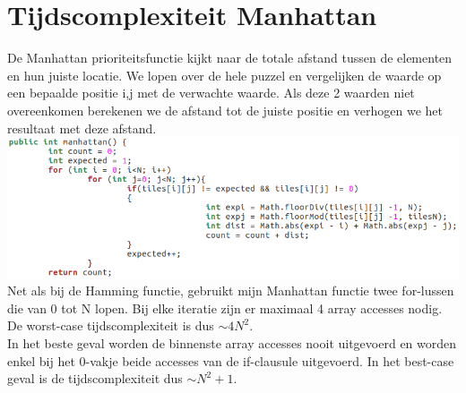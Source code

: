 \documentclass[11pt, a4paper]{article}
\begin{document}
\section*{Tijdscomplexiteit Manhattan}
De Manhattan prioriteitsfunctie kijkt naar de totale afstand tussen de elementen en hun juiste locatie. We lopen over de hele puzzel en vergelijken de waarde op een bepaalde positie i,j met de verwachte waarde. Als deze 2 waarden niet overeenkomen berekenen we de afstand tot de juiste positie en verhogen we het resultaat met deze afstand.\vspace*{10px}
\includegraphics[width=\textwidth]{manhattan}\\
\vspace*{10px}
Net als bij de Hamming functie, gebruikt mijn Manhattan functie twee for-lussen die van 0 tot N lopen. Bij elke iteratie zijn er maximaal 4 array accesses nodig. De worst-case tijdscomplexiteit is dus $\sim 4N^2$.\\
In het beste geval worden de binnenste array accesses nooit uitgevoerd en worden enkel bij het 0-vakje beide accesses van de if-clausule uitgevoerd. In het best-case geval is de tijdscomplexiteit dus $\sim N^2 + 1$.

\newpage
\end{document}
